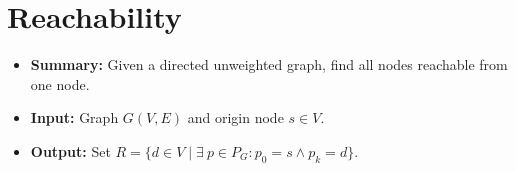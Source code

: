 \section{Reachability} \label{algorithm-reachability}
\begin{itemize}
    \item \textbf{Summary:} Given a directed unweighted graph, find all nodes reachable from one node.
    \item \textbf{Input:} Graph $G(V,E)$ and origin node $s \in V$.
    \item \textbf{Output:} Set $R=\{d \in V \mid \exists~p \in P_G\colon p_0 = s \wedge p_k = d\}$.
\end{itemize}

